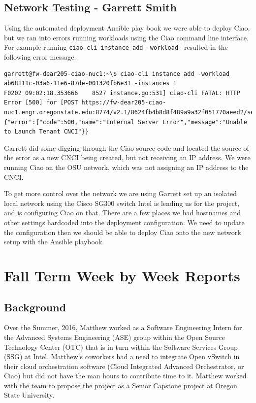 \documentclass[10pt,onecolumn,journal,draftclsnofoot]{IEEEtran}
\begin{document}
\subsection{Network Testing - Garrett Smith}

Using the automated deployment Ansible play book we were able to deploy Ciao,
but we ran into errors running workloads using the Ciao command line interface.
For example running \texttt{ciao-cli instance add -workload } resulted in the
following error message.

\begin{lstlisting}[caption = Failing to run a workload]
garrett@fw-dear205-ciao-nuc1:~\$ ciao-cli instance add -workload ab68111c-03a6-11e6-87de-001320fb6e31 -instances 1
F0202 09:02:18.353666    8527 instance.go:531] ciao-cli FATAL: HTTP Error [500] for [POST https://fw-dear205-ciao-nuc1.engr.oregonstate.edu:8774/v2.1/8624fb4b8d8f489a9a32f051770aeed2/servers]: {"error":{"code":500,"name":"Internal Server Error","message":"Unable to Launch Tenant CNCI"}}
\end{lstlisting}

Garrett did some digging through the Ciao source code and located the source of
the error as a new CNCI being created, but not receiving an IP address. We were
running Ciao on the OSU network, which was not assigning an IP address to the
CNCI.

To get more control over the network we are using Garrett set up an isolated
local network using the Cisco SG300 switch Intel is lending us for the project,
and is configuring Ciao on that. There are a few places we had hostnames and
other settings hardcoded into the deployment configuration. We need to update
the configuration then we should be able to deploy Ciao onto the new network
setup 
with the Ansible playbook.

\section{Fall Term Week by Week Reports}

\subsection{Background}

Over the Summer, 2016, Matthew worked as a Software Engineering Intern for the
Advanced Systems Engineering (ASE) group within the Open Source Technology
Center (OTC) that is in turn within the Software Services Group (SSG) at Intel.
Matthew's coworkers had a need to integrate Open vSwitch in their cloud
orchestration software (Cloud Integrated Advanced Orchestrator, or Ciao) but did
not have the man hours to contribute time to it. Matthew worked with the team to
propose the project as a Senior Capstone project at Oregon State University.
\end{document}
